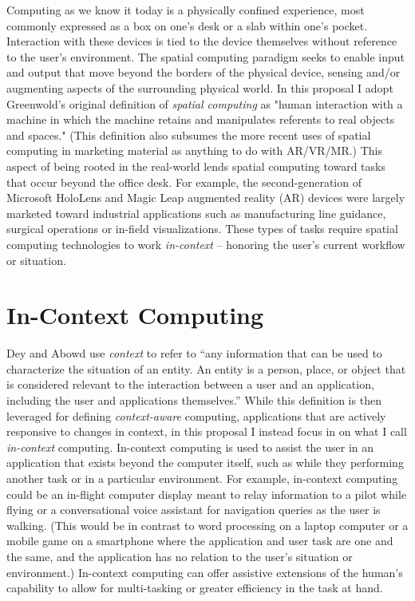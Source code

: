 \documentclass [11pt, proquest] {uwthesis}[2020/02/24]
\begin{document}
Computing as we know it today is a physically confined experience, most commonly expressed as a box on one's desk or a slab within one's pocket. Interaction with these devices is tied to the device themselves without reference to the user’s environment. The spatial computing paradigm seeks to enable input and output that move beyond the borders of the physical device, sensing and/or augmenting aspects of the surrounding physical world. In this proposal I adopt Greenwold’s original definition of \textit{spatial computing} as "human interaction with a machine in which the machine retains and manipulates referents to real objects and spaces." (This definition also subsumes the more recent uses of spatial computing in marketing material as anything to do with AR/VR/MR.) This aspect of being rooted in the real-world lends spatial computing toward tasks that occur beyond the office desk. For example, the second-generation of Microsoft HoloLens and Magic Leap augmented reality (AR) devices were largely marketed toward industrial applications such as manufacturing line guidance, surgical operations or in-field visualizations. These types of tasks require spatial computing technologies to work \textit{in-context} -- honoring the user’s current workflow or situation. 
 
 
\section{In-Context Computing}
 
Dey and Abowd use \textit{context} to refer to “any information that can be used to characterize the situation of an entity. An entity is a person, place, or object that is considered relevant to the interaction between a user and an application, including the user and applications themselves.” While this definition is then leveraged for defining \textit{context-aware} computing, applications that are actively responsive to changes in context, in this proposal I instead focus in on what I call \textit{in-context} computing. In-context computing is used to assist the user in an application that exists beyond the computer itself, such as while they performing another task or in a particular environment. For example, in-context computing could be an in-flight computer display meant to relay information to a pilot while flying or a conversational voice assistant for navigation queries as the user is walking. (This would be in contrast to word processing on a laptop computer or a mobile game on a smartphone where the application and user task are one and the same, and the application has no relation to the user’s situation or environment.) In-context computing can offer assistive extensions of the human’s capability to allow for multi-tasking or greater efficiency in the task at hand. 
 
\end{document}
